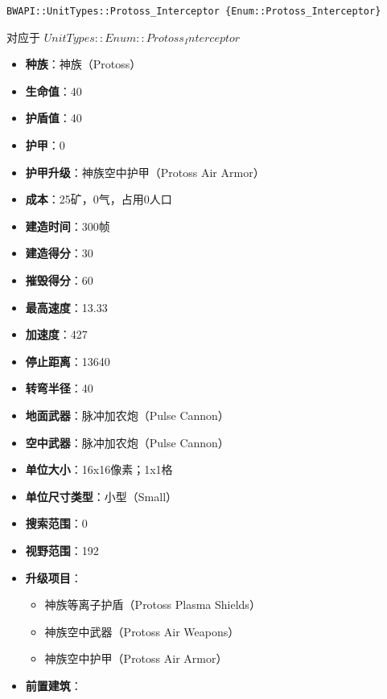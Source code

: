 \begin{tcolorbox}[colback=white, colframe=black!60!white, title=Protoss\_Interceptor(), arc=0mm]
    \begin{verbatim}
BWAPI::UnitTypes::Protoss_Interceptor {Enum::Protoss_Interceptor}
    \end{verbatim}
    对应于  $ UnitTypes::Enum::Protoss_Interceptor $ 
    \begin{itemize}
        \item \textbf{种族}：神族（Protoss）
        \item \textbf{生命值}：40
        \item \textbf{护盾值}：40
        \item \textbf{护甲}：0
        \item \textbf{护甲升级}：神族空中护甲（Protoss Air Armor）
        \item \textbf{成本}：25矿，0气，占用0人口
        \item \textbf{建造时间}：300帧
        \item \textbf{建造得分}：30
        \item \textbf{摧毁得分}：60
        \item \textbf{最高速度}：13.33
        \item \textbf{加速度}：427
        \item \textbf{停止距离}：13640
        \item \textbf{转弯半径}：40
        \item \textbf{地面武器}：脉冲加农炮（Pulse Cannon）
        \item \textbf{空中武器}：脉冲加农炮（Pulse Cannon）
        \item \textbf{单位大小}：16x16像素；1x1格
        \item \textbf{单位尺寸类型}：小型（Small）
        \item \textbf{搜索范围}：0
        \item \textbf{视野范围}：192
        \item \textbf{升级项目}：
            \begin{itemize}
                \item 神族等离子护盾（Protoss Plasma Shields）
                \item 神族空中武器（Protoss Air Weapons）
                \item 神族空中护甲（Protoss Air Armor）
            \end{itemize}
        \item \textbf{前置建筑}：

\end{itemize}
\end{tcolorbox}
